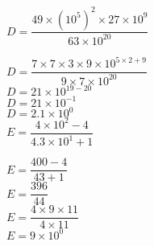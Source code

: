     \begin{spacing}{2}
        \begin{itemize}
            \def\item{}
            \item $D=\dfrac{49\times (10^{5})^2\times 27 \times 10^9}{63\times 10^{20}}$

            {\red
                $D=\dfrac{7\times 7\times 3\times 9 \times 10^{5\times 2 + 9}}{9\times 7\times 10^{20}}$\\
                $D=21\times 10^{19-20}$\\
                $D=21\times 10^{-1}$\\
                $D=\num{2.1}\times 10^{0}$\\
            }
            \item $E=\dfrac{4\times 10^{2} -4}{\num{4.3}\times 10^1 + 1}$

            {\red
                $E=\dfrac{400 -4}{43 + 1}$\\
                $E=\dfrac{396}{44}$\\
                $E=\dfrac{4\times 9\times 11}{4\times 11}$\\
                $E=9\times 10^0$
            }
        \end{itemize}
    \end{spacing}
